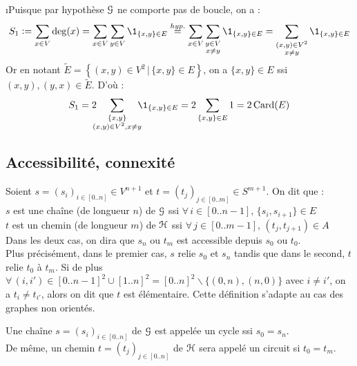 		\eqskip{2mm}
		\begin{Preuve}
			\i Puisque par hypothèse \(\EuScript{G}\) ne comporte pas de boucle, on a :
				\[
					S_1 := \sum_{x\in V} \deg(x) = \sum_{x\in V}\sum_{y\in V} \1_{\{x,y\}\in E} \overset{hyp.}{=} \sum_{x\in V}\sum_{\substack{y\in V \\ x\neq y}} \1_{\{x,y\}\in E} = \sum_{\substack{(x,y)\in V^2\\ x\neq y}} \1_{\{x,y\}\in E}
				\]
			Or en notant \(\widetilde{E} = \left\{(x,y)\in V^2\,|\,\{x,y\}\in E\right\}\), on a \(\{x,y\}\in E\) ssi \((x,y),(y,x)\in \widetilde{E}\). D'où :
				\[
					S_1 = 2 \hs{-2} \sum_{\substack{\{x,y\} \\ (x,y)\in V^2, x\neq y}} \hs{-2} \1_{\{x,y\}\in E} = 2\sum_{\{x,y\}\in E} 1 = 2\card(E)
				\]
			\ii
		\end{Preuve}
	
	\subsection{Accessibilité, connexité}
	
		
		\begin{Definition}
			Soient \(s = (s_i)_{i\in[0..n]} \in V^{n+1}\) et \(t = (t_j)_{j\in[0..m]} \in S^{m+1}\). On dit que : \\
			 \bdot \(s\) est une chaîne (de longueur \(n\)) de \(\EuScript{G}\) ssi \(\forall\,i\in[0..n-1],\, \{s_i,s_{i+1}\}\in E\) \\
			 \bdot \(t\) est un chemin (de longueur \(m\)) de \(\EuScript{H}\) ssi \(\forall\,j\in[0..m-1]\), \((t_j,t_{j+1})\in A\) \nt
		Dans les deux cas, on dira que \(s_n\) ou \(t_m\) est accessible depuis \(s_0\) ou \(t_0\). \\
		Plus précisément, dans le premier cas, \(s\) relie \(s_0\) et \(s_n\) tandis que dans le second, \(t\) relie \(t_0\) à \(t_m\). \nll
		Si de plus \(\forall\,(i,i')\in[0..n-1]^2\cup[1..n]^2 = [0..n]^2\backslash\{(0,n),(n,0)\}\) avec \(i\neq i'\), on a \(t_i \neq t_{i'}\), alors on dit que \(t\) est élémentaire. Cette définition s'adapte au cas des graphes non orientés.
		\end{Definition}
	
		\begin{Definition}
			Une chaîne \(s = (s_i)_{i\in[0..n]}\) de \(\EuScript{G}\) est appelée un cycle ssi \(s_0 = s_n\). \\
			De même, un chemin \(t = (t_j)_{j\in[0..n]}\) de \(\EuScript{H}\) sera appelé un circuit si \(t_0 = t_m\).
		\end{Definition}
		
